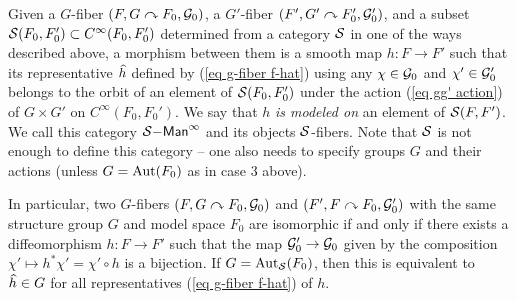 \begin{defn}\label{def S-fibers}
    Given a $G$-fiber $(F,G\curvearrowright F_0,\mathcal{G}_0)$, a $G'$-fiber $(F',G'\curvearrowright F_0',\mathcal{G}_0')$, and a subset $\mathcal{S}(F_0,F_0')\subset C^\infty(F_0,F_0')$ determined from a category $\mathcal{S}$ in one of the ways described above, a morphism between them is a smooth map $h: F\to F'$ such that its representative $\wh{h}$ defined by (\ref{eq g-fiber f-hat}) using any $\chi\in\mathcal{G}_0$ and $\chi'\in\mathcal{G}_0'$ belongs to the orbit of an element of $\mathcal{S}(F_0,F_0')$ under the action (\ref{eq gg' action}) of $G\times G'$ on $C^\infty(F_0,F_0')$. We say that $h$ \emph{is modeled on} an element of $\mathcal{S}(F,F')$. We call this category $\mathcal{S}\mathsf{-Man}^\infty$ and its objects $\mathcal{S}$-fibers. Note that $\mathcal{S}$ is not enough to define this category -- one also needs to specify groups $G$ and their actions (unless $G=\operatorname{Aut}(F_0)$ as in case 3 above).

    In particular, two $G$-fibers $(F,G\curvearrowright F_0,\mathcal{G}_0)$ and $(F',F\curvearrowright F_0,\mathcal{G}_0')$ with the same structure group $G$ and model space $F_0$ are isomorphic if and only if there exists a diffeomorphism $h:F\to F'$ such that the map $\mathcal{G}_0'\to \mathcal{G}_0$ given by the composition $\chi'\mapsto h^\ast \chi'=\chi'\circ h$ is a bijection. If $G=\operatorname{Aut}_{\mathcal{S}}(F_0)$, then this is equivalent to $\wh{h}\in G$ for all representatives (\ref{eq g-fiber f-hat}) of $h$.
\end{defn}

